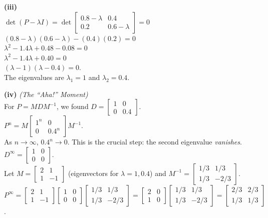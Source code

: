 \begin{solution}
\medskip
\textbf{(iii)} \\
$\det(P - \lambda I) = \det \begin{bmatrix} 0.8 - \lambda & 0.4 \\ 0.2 & 0.6 - \lambda \end{bmatrix} = 0$ \\
$(0.8 - \lambda)(0.6 - \lambda) - (0.4)(0.2) = 0$ \\
$\lambda^2 - 1.4\lambda + 0.48 - 0.08 = 0$ \\
$\lambda^2 - 1.4\lambda + 0.40 = 0$ \\
$(\lambda - 1)(\lambda - 0.4) = 0$. \\
The eigenvalues are $\lambda_1 = 1$ and \textbf{$\lambda_2 = 0.4$}.

\medskip
\textbf{(iv)} \textit{(The ``Aha!'' Moment)} \\
For $P = M D M^{-1}$, we found $D = \begin{bmatrix} 1 & 0 \\ 0 & 0.4 \end{bmatrix}$. \\
$P^n = M \begin{bmatrix} 1^n & 0 \\ 0 & 0.4^n \end{bmatrix} M^{-1}$. \\
As $n \to \infty$, $0.4^n \to 0$. This is the crucial step: the second eigenvalue \textit{vanishes}. \\
$D^\infty = \begin{bmatrix} 1 & 0 \\ 0 & 0 \end{bmatrix}$. \\
Let $M = \begin{bmatrix} 2 & 1 \\ 1 & -1 \end{bmatrix}$ (eigenvectors for $\lambda=1, 0.4$) and $M^{-1} = \begin{bmatrix} 1/3 & 1/3 \\ 1/3 & -2/3 \end{bmatrix}$. \\
$P^\infty = \begin{bmatrix} 2 & 1 \\ 1 & -1 \end{bmatrix} \begin{bmatrix} 1 & 0 \\ 0 & 0 \end{bmatrix} \begin{bmatrix} 1/3 & 1/3 \\ 1/3 & -2/3 \end{bmatrix} = \begin{bmatrix} 2 & 0 \\ 1 & 0 \end{bmatrix} \begin{bmatrix} 1/3 & 1/3 \\ 1/3 & -2/3 \end{bmatrix} = \begin{bmatrix} 2/3 & 2/3 \\ 1/3 & 1/3 \end{bmatrix}$. \\

\end{solution}
